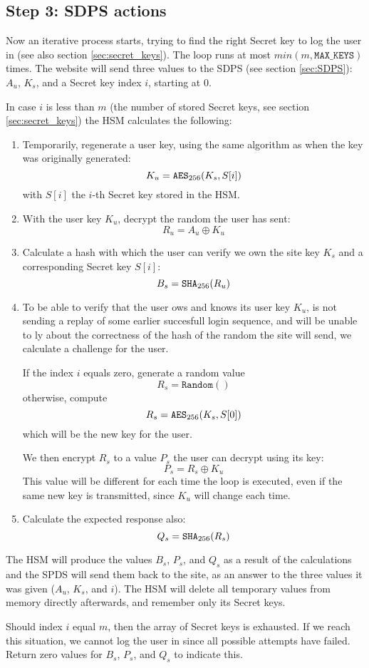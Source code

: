 \subsection{Step 3: SDPS actions}
\label{sec:login_step3}
Now an iterative process starts, trying to find the right Secret key to log the user in (see also section \ref{sec:secret_keys}).
The loop runs at most $min(m,\mathtt{MAX\_KEYS})$ times.
The website will send three values to the SDPS (see section \ref{sec:SDPS}): $A_u$, $K_s$, and a Secret key index $i$, starting at 0.
\par
In case $i$ is less than $m$
(the number of stored Secret keys, see section \ref{sec:secret_keys})
the HSM calculates the following:
\begin{enumerate}
\item Temporarily, regenerate a user key, using the same algorithm as when the key was originally generated:
\[K_u=\mathtt{AES}_{256}(K_s,S[i])\]
with $S[i]$ the $i$-th Secret key stored in the HSM.
\item With the user key $K_u$, decrypt the random the user has sent:
\[R_u=A_u \oplus K_u\]
\item Calculate a hash with which the user can verify we own the site key $K_s$ and a corresponding Secret key $S[i]$:
\[B_s=\mathtt{SHA}_{256}(R_u)\]
\item To be able to verify that the user ows and knows its user key $K_u$,
is not sending a replay of some earlier succesfull login sequence,
and will be unable to ly about the correctness of the hash of the random the site will send,
we calculate a challenge for the user.
\par
If the index $i$ equals zero, generate a random value
\[R_s=\mathtt{Random}()\]
otherwise, compute
\[R_s=\mathtt{AES}_{256}(K_s,S[0])\]
which will be the new key for the user.
\par
We then encrypt $R_s$ to a value $P_s$ the user can decrypt using its key:
\[P_s=R_s \oplus K_u\]
This value will be different for each time the loop is executed,
even if the same new key is transmitted,
since $K_u$ will change each time.
\item Calculate the expected response also:
\[Q_s=\mathtt{SHA}_{256}(R_s)\]
\end{enumerate}
The HSM will produce the values $B_s$, $P_s$, and $Q_s$ as a result of the calculations and the SPDS will send them back to the site,
as an answer to the three values it was given ($A_u$, $K_s$, and $i$).
The HSM will delete all temporary values from memory directly afterwards, and remember only its Secret keys.
\par
Should index $i$ equal $m$, then the array of Secret keys is exhausted.
If we reach this situation, we cannot log the user in since all possible attempts have failed.
Return zero values for $B_s$, $P_s$, and $Q_s$ to indicate this.

